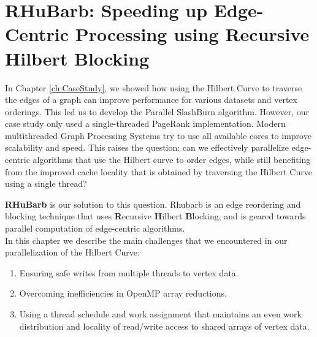 \chapter{RHuBarb: Speeding up Edge-Centric Processing using Recursive Hilbert Blocking}
\label{ch:Rhubarb}



In Chapter \ref{ch:CaseStudy}, we showed how using the Hilbert Curve to traverse the edges of a graph can improve performance for various datasets and vertex orderings. This led us to develop the Parallel SlashBurn algorithm. However, our case study only used a single-threaded PageRank implementation. Modern multithreaded Graph Processing Systems try to use all available cores to improve scalability and speed. This raises the question: can we effectively parallelize edge-centric algorithms that use the Hilbert curve to order edges, while still benefiting from the improved cache locality that is obtained by traversing the Hilbert Curve using a single thread?


\textbf{RHuBarb} is our solution to this question. Rhubarb is an edge reordering and blocking technique that uses \textbf{R}ecursive \textbf{H}ilbert \textbf{B}locking, and is geared towards parallel computation of edge-centric algorithms.\\
In this chapter we describe the main challenges that we encountered in our parallelization of the Hilbert Curve:
\begin{enumerate}
    \item Ensuring safe writes from multiple threads to vertex data.
    \item Overcoming inefficiencies in OpenMP \cite{openmp} array reductions.
    \item Using a thread schedule and work assignment that maintains an even work distribution and  locality of read/write access to shared arrays of vertex data.
\end{enumerate}

